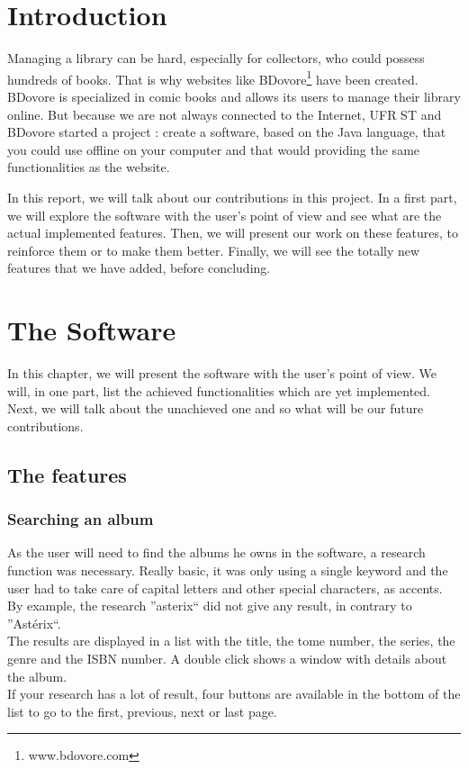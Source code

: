 \documentclass[11pt]{report} %
\begin{document}

\newpage
\tableofcontents
\newpage

\chapter{Introduction}
Managing a library can be hard, especially for collectors, who could possess hundreds of books. That is why websites like BDovore\footnote{www.bdovore.com} have been created. BDovore is specialized in comic books and allows its users to manage their library online. But because we are not always connected to the Internet, UFR ST and BDovore started a project : create a software, based on the Java language, that you could use offline on your computer and that would providing the same functionalities as the website.

In this report, we will talk about our contributions in this project. In a first part, we will explore the software with the user's point of view and see what are the actual implemented features. Then, we will present our work on these features, to reinforce them or to make them better. Finally, we will see the totally new features that we have added, before concluding.

\chapter{The Software}
In this chapter, we will present the software with the user's point of view. We will, in one part, list the achieved functionalities which are yet implemented. Next, we will talk about the unachieved one and so what will be our future contributions.

\section{The features}
\subsection{Searching an album}
As the user will need to find the albums he owns in the software, a research function was necessary. Really basic, it was only using a single keyword and the user had to take care of capital letters and other special characters, as accents. By example, the research ''asterix`` did not give any result, in contrary to ''Astérix``.\\
The results are displayed in a list with the title, the tome number, the series, the genre and the ISBN number. A double click shows a window with details about the album.\\
If your research has a lot of result, four buttons are available in the bottom of the list to go to the first, previous, next or last page.
\end{document}
